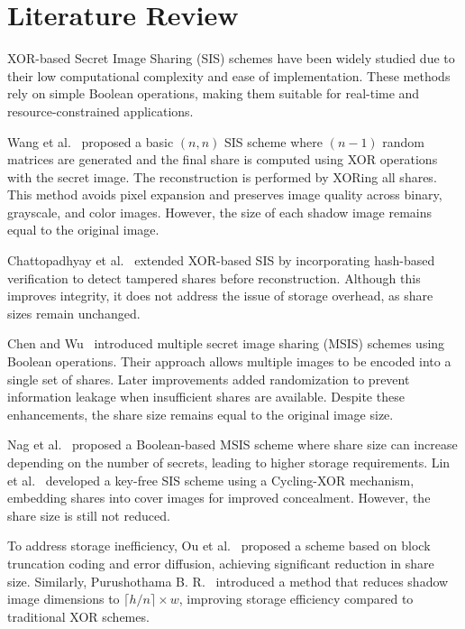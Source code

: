 \section{Literature Review}
\label{sec:lad-litreview}


XOR-based Secret Image Sharing (SIS) schemes have been widely studied due to their low computational complexity and ease of implementation. These methods rely on simple Boolean operations, making them suitable for real-time and resource-constrained applications.

Wang et al.~\cite{wang_xor_basic} proposed a basic $(n,n)$ SIS scheme where $(n-1)$ random matrices are generated and the final share is computed using XOR operations with the secret image. The reconstruction is performed by XORing all shares. This method avoids pixel expansion and preserves image quality across binary, grayscale, and color images. However, the size of each shadow image remains equal to the original image.

Chattopadhyay et al.~\cite{chattopadhyay_hash} extended XOR-based SIS by incorporating hash-based verification to detect tampered shares before reconstruction. Although this improves integrity, it does not address the issue of storage overhead, as share sizes remain unchanged.

Chen and Wu~\cite{chen_wu_msis, chen_wu_secure} introduced multiple secret image sharing (MSIS) schemes using Boolean operations. Their approach allows multiple images to be encoded into a single set of shares. Later improvements added randomization to prevent information leakage when insufficient shares are available. Despite these enhancements, the share size remains equal to the original image size.

Nag et al.~\cite{nag_boolean} proposed a Boolean-based MSIS scheme where share size can increase depending on the number of secrets, leading to higher storage requirements. Lin et al.~\cite{lin2024} developed a key-free SIS scheme using a Cycling-XOR mechanism, embedding shares into cover images for improved concealment. However, the share size is still not reduced.

To address storage inefficiency, Ou et al.~\cite{ou2015userfriendly} proposed a scheme based on block truncation coding and error diffusion, achieving significant reduction in share size. Similarly, Purushothama B. R.~\cite{purushothama_size} introduced a method that reduces shadow image dimensions to $\lceil h/n \rceil \times w$, improving storage efficiency compared to traditional XOR schemes.

